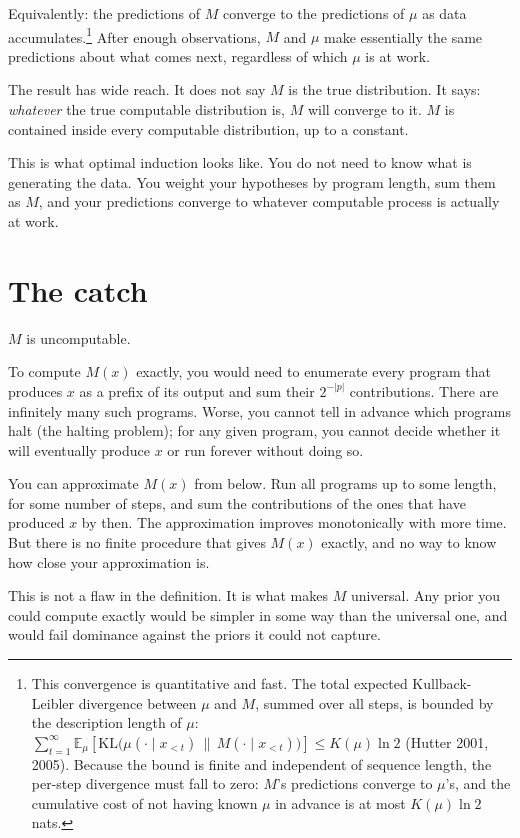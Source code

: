 Equivalently: the predictions of $M$ converge to the predictions of $\mu$ as data accumulates.\footnote{This convergence is quantitative and fast. The total expected Kullback-Leibler divergence between $\mu$ and $M$, summed over all steps, is bounded by the description length of $\mu$: $\sum_{t=1}^{\infty} \mathbb{E}_\mu\!\left[\mathrm{KL}\big(\mu(\cdot \mid x_{<t}) \,\|\, M(\cdot \mid x_{<t})\big)\right] \leq K(\mu)\ln 2$ (Hutter 2001, 2005). Because the bound is finite and independent of sequence length, the per-step divergence must fall to zero: $M$'s predictions converge to $\mu$'s, and the cumulative cost of not having known $\mu$ in advance is at most $K(\mu)\ln 2$ nats.} After enough observations, $M$ and $\mu$ make essentially the same predictions about what comes next, regardless of which $\mu$ is at work.

The result has wide reach. It does not say $M$ is the true distribution. It says: \emph{whatever} the true computable distribution is, $M$ will converge to it. $M$ is contained inside every computable distribution, up to a constant.

This is what optimal induction looks like. You do not need to know what is generating the data. You weight your hypotheses by program length, sum them as $M$, and your predictions converge to whatever computable process is actually at work.

\section*{The catch}

$M$ is uncomputable.

To compute $M(x)$ exactly, you would need to enumerate every program that produces $x$ as a prefix of its output and sum their $2^{-|p|}$ contributions. There are infinitely many such programs. Worse, you cannot tell in advance which programs halt (the halting problem); for any given program, you cannot decide whether it will eventually produce $x$ or run forever without doing so.

You can approximate $M(x)$ from below. Run all programs up to some length, for some number of steps, and sum the contributions of the ones that have produced $x$ by then. The approximation improves monotonically with more time. But there is no finite procedure that gives $M(x)$ exactly, and no way to know how close your approximation is.

This is not a flaw in the definition. It is what makes $M$ universal. Any prior you could compute exactly would be simpler in some way than the universal one, and would fail dominance against the priors it could not capture.

